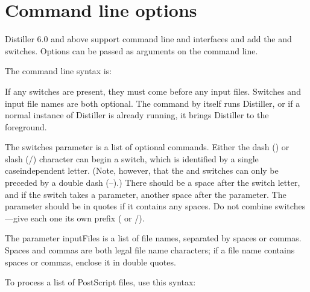 \documentclass[letterpaper,12pt,english,openany,oneside]{sphinxmanual}
\begin{document}
\section{Command line options}
\label{\detokenize{Distiller_WinIntro:command-line-options}}
Distiller 6.0 and above support command line and  interfaces and add the  and  switches. Options can be passed as arguments on the command line.

The command line syntax is:

\begin{sphinxVerbatim}[commandchars=\\\{\}]
 \PYG{p}{[}\PYG{p}{]} \PYG{p}{[}\PYG{p}{]}
\end{sphinxVerbatim}

If any switches are present, they must come before any input files. Switches and input file names are both optional. The command  by itself runs Distiller, or if a normal instance of Distiller is already running, it brings Distiller to the foreground.

The switches parameter is a list of optional commands. Either the dash (\sphinxhyphen{}) or slash (/) character can begin a switch, which is identified by a single case\sphinxhyphen{}independent letter. (Note, however, that the  and  switches can only be preceded by a double dash (–).) There should be a space after the switch letter, and if the switch takes a parameter, another space after the parameter. The parameter should be in quotes if it contains any spaces. Do not combine switches—give each one its own prefix (\sphinxhyphen{} or /).

The parameter inputFiles is a list of file names, separated by spaces or commas. Spaces and commas are both legal file name characters; if a file name contains spaces or commas, enclose it in double quotes.

To process a list of PostScript files, use this syntax:

\begin{sphinxVerbatim}[commandchars=\\\{\}]
 \PYG{p}{[}\PYG{p}{]} \PYG{p}{[} \PYG{p}{]}
\end{sphinxVerbatim}
\end{document}
